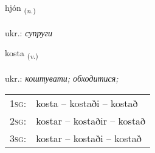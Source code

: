 \documentclass[frontgrid, backgrid]{flacards}\usepackage[]{graphicx}\usepackage[]{xcolor}
\begin{document}
\renewcommand{\flhead}{\vskip5pt \fboxsep=0pt {\small\bfseries\footnotesize Nafnorð | іменник}}
\renewcommand{\fcfoot}{\vskip5pt \fboxsep=0pt \hspace{2pt}{\small\bfseries\footnotesize 1K}}

\renewcommand{\blhead}{\vskip5pt {\small\bfseries\footnotesize Nafnorð | іменник }}
\renewcommand{\bcfoot}{\vskip5pt \hspace{2pt}{\small\bfseries\footnotesize 1K}}


{hjón \small{\textsubscript{(\textit{n.})}} \\[1ex] %
\textphonetic{[çouːn]} \\
ukr.: \emph{супруги} \\  [2ex]
\renewcommand*{\arraystretch}{0.8}
}

\renewcommand{\flhead}{\vskip5pt \fboxsep=0pt {\small\bfseries\footnotesize Sagnorð | дієслово}}
\renewcommand{\fcfoot}{\vskip5pt \fboxsep=0pt \hspace{2pt}{\small\bfseries\footnotesize 1K}}

\renewcommand{\blhead}{\vskip5pt {\small\bfseries\footnotesize Sagnorð | дієслово }}
\renewcommand{\bcfoot}{\vskip5pt \hspace{2pt}{\small\bfseries\footnotesize 1K}}


{kosta \small{\textsubscript{(\textit{v.})}} \\[1ex] %
\textphonetic{[kʰɔsta]} \\
ukr.: \emph{коштувати; обходитися;} \\  [2ex]
\renewcommand*{\arraystretch}{0.8}
\begin{tabular}{p{1cm}l}
\textsc{1sg}: & kosta -- kostaði -- kostað \\ 
\textsc{2sg}: & kostar -- kostaðir -- kostað \\ 
\textsc{3sg}: & kostar -- kostaði -- kostað \\ 
\end{tabular}
}
\end{document}
